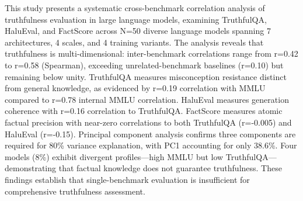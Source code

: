 
This study presents a systematic cross-benchmark correlation analysis of truthfulness evaluation in large language models, examining TruthfulQA, HaluEval, and FactScore across N=50 diverse language models spanning 7 architectures, 4 scales, and 4 training variants. The analysis reveals that truthfulness is multi-dimensional: inter-benchmark correlations range from r=0.42 to r=0.58 (Spearman), exceeding unrelated-benchmark baselines (r=0.10) but remaining below unity. TruthfulQA measures misconception resistance distinct from general knowledge, as evidenced by r=0.19 correlation with MMLU compared to r=0.78 internal MMLU correlation. HaluEval measures generation coherence with r=0.16 correlation to TruthfulQA. FactScore measures atomic factual precision with near-zero correlations to both TruthfulQA (r=-0.005) and HaluEval (r=-0.15). Principal component analysis confirms three components are required for 80\% variance explanation, with PC1 accounting for only 38.6\%. Four models (8\%) exhibit divergent profiles---high MMLU but low TruthfulQA---demonstrating that factual knowledge does not guarantee truthfulness. These findings establish that single-benchmark evaluation is insufficient for comprehensive truthfulness assessment.
